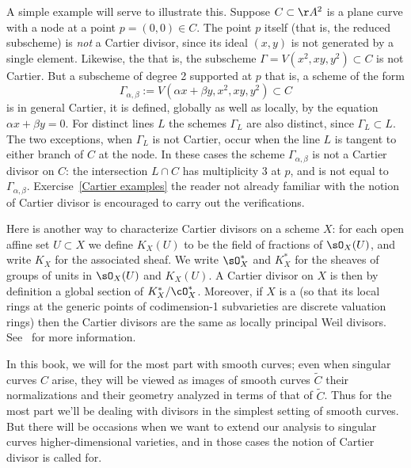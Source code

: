 A simple example will serve to illustrate this. Suppose $C \subset
\AA^2$ is a plane curve with a node at a point $p = (0,0) \in C$. The
point $p$ itself (that is, the reduced subscheme) is \emph{not} a
Cartier divisor, since its ideal $(x,y)$ is not generated by a single
element. Likewise, the 
%
\emdash that is, the subscheme $\Gamma = V(x^2, xy, y^2) \subset C$
\emdash is not Cartier. But a subscheme of degree 2 supported at $p$
\emdash that is, a scheme of the form
$$
\Gamma_{\alpha, \beta} := V(\alpha x + \beta y, x^2, xy, y^2) \subset C
$$ 
\emdash 
is in general Cartier, 
it is defined, globally as well as locally, by the equation $\alpha x + \beta y = 0$. 
For distinct lines $L$ the schemes $\Gamma_{L}$ are also distinct,
since $\Gamma_{L}\subset L$. The two exceptions, when $\Gamma_{L}$ is
not Cartier, occur when the line $L$ is tangent to either branch of
$C$ at the node. 
In these cases the scheme $\Gamma_{\alpha, \beta}$ is not a Cartier
divisor on $C$: the intersection $L \cap C$ has multiplicity 3 at $p$,
and is not equal to $\Gamma_{\alpha, \beta}$. 
%
Exercise~\ref{Cartier examples} 
the reader
not already familiar with the notion of Cartier divisor is
encouraged to carry out the verifications. 

Here is another way to characterize Cartier divisors on a scheme $X$: for each open affine set $U\subset X$ we define $K_X(U)$ to be the field of fractions of $\sO_X(U)$, and write $K_X$ for the
%
%
%
associated sheaf. We write $\sO_X^*$ and $K_X^*$ for the sheaves of groups of units in $\sO_X(U)$ and $K_X(U)$.
A Cartier divisor on $X$ is then by definition a global section of $K_X^*/\cO_X^*$. 
Moreover, if $X$ is a 
%
(so that its local rings at
%
the generic points of codimension-1 subvarieties are discrete
valuation rings) then the Cartier divisors are the same as locally
principal Weil divisors. See~\cite[Section II.6]{Hartshorne1977} for
more information. 

In this book, we will 
for the most part with smooth curves;
even when singular curves $C$ arise, they will be viewed as images of
smooth curves $\tilde C$
\redden{\emdash} 
their normalizations
\redden{\emdash} 
and their geometry
analyzed in terms of that of $\tilde C$. Thus for the most part we'll
be dealing with divisors in the simplest setting of smooth curves. But
there will be occasions when we want to extend our analysis to
singular curves 
higher-dimensional varieties, and in those
cases the notion of Cartier divisor is called for. 

